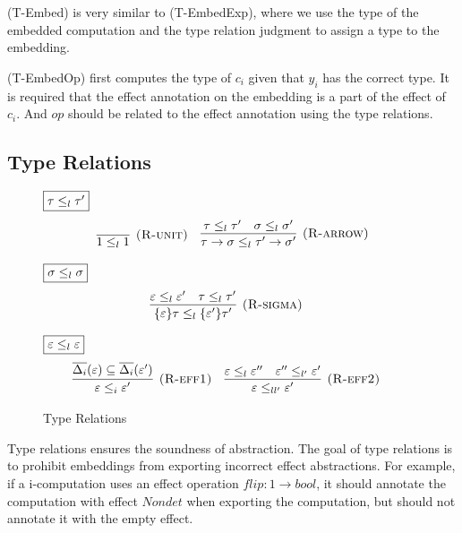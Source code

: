(T-Embed) is very similar to (T-EmbedExp), where we use the type of the embedded computation and the type relation judgment to assign a type to the embedding. 

(T-EmbedOp) first computes the type of $c_i$ given that $y_i$ has the correct type. It is required that the effect annotation on the embedding is a part of the effect of $c_i$. And $op$ should be related to the effect annotation using the type relations.

\subsection{Type Relations}
\begin{figure}[H]
\footnotesize{
\noindent$\fbox{$\tau \leq_l \tau'$}$
\[
\begin{array}{c}

\infer[\textsc{(R-unit)}]
	{1 \leq_l 1}
	{} \quad

\infer[\textsc{(R-arrow)}]
	{\tau \rightarrow \sigma \leq_l \tau' \rightarrow \sigma'}
	{\tau \leq_l \tau' & \sigma \leq_l \sigma'}
  
\end{array} \\[3ex]
\]

\noindent$\fbox{$\sigma \leq_l \sigma$}$
\[
\begin{array}{c}

\infer[\textsc{(R-sigma)}]
	{\{\varepsilon\}\tau \leq_l \{\varepsilon'\}\tau'}
	{ \varepsilon \leq_l \varepsilon' & \tau \leq_l \tau' } \quad
  
\end{array} \\[3ex]
\]

\noindent$\fbox{$\varepsilon \leq_l \varepsilon$}$
\[
\begin{array}{c}

\infer[\textsc{(R-eff1)}]
	{\varepsilon \leq_i \varepsilon'}
	{ \overline{\Delta_i}(\varepsilon) \subseteq \overline{\Delta_i}(\varepsilon')  } \quad

\infer[\textsc{(R-eff2)}]
	{\varepsilon \leq_{ll'} \varepsilon'}
	{  \varepsilon \leq_l \varepsilon'' &   \varepsilon'' \leq_{l'} \varepsilon' } \quad
\end{array} \\[3ex]
\]
}

\caption{Type Relations}
\label{wrap-static}
\end{figure}

Type relations ensures the soundness of abstraction. The goal of type relations is to prohibit embeddings from exporting incorrect effect abstractions. For example, if a i-computation uses an effect operation $flip : 1 \rightarrow bool$, it should annotate the computation with effect $Nondet$ when exporting the computation, but should not  annotate it with the empty effect.

